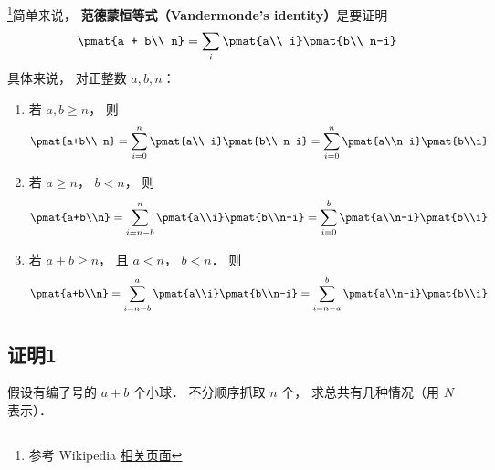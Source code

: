 

\footnote{参考 Wikipedia \href{https://en.wikipedia.org/wiki/Vandermonde's_identity}{相关页面}}简单来说， \textbf{范德蒙恒等式（Vandermonde's identity）}是要证明
\begin{equation}
\pmat{a + b\\ n} = \sum_i \pmat{a\\ i} \pmat{b\\ n-i}
\end{equation}
具体来说， 对正整数 $a,b,n$：
\begin{enumerate}
\item 若 $a,b \geqslant n$，  则
\begin{equation}
\pmat{a+b\\ n} = \sum\limits_{i = 0}^n \pmat{a\\ i} \pmat{b\\ n-i} = \sum\limits_{i = 0}^n \pmat{a\\n-i}\pmat{b\\i}
\end{equation}

\item 若 $a \geqslant n$，  $b < n$，   则
\begin{equation}
\pmat{a+b\\n} = \sum\limits_{i = n - b}^n \pmat{a\\i}\pmat{b\\n-i} = \sum\limits_{i = 0}^b \pmat{a\\n-i} \pmat{b\\i}
\end{equation}
\item 若 $a + b \geqslant n$，   且 $a < n$，   $b < n$．  则
\begin{equation}
\pmat{a+b\\n} = \sum\limits_{i = n - b}^a \pmat{a\\i} \pmat{b\\n-i} = \sum\limits_{i = n - a}^b \pmat{a\\n-i} \pmat{b\\i}
\end{equation}
\end{enumerate}

\subsection{证明1}

假设有编了号的 $a+b$ 个小球． 不分顺序抓取 $n$ 个， 求总共有几种情况（用 $N$ 表示）．

